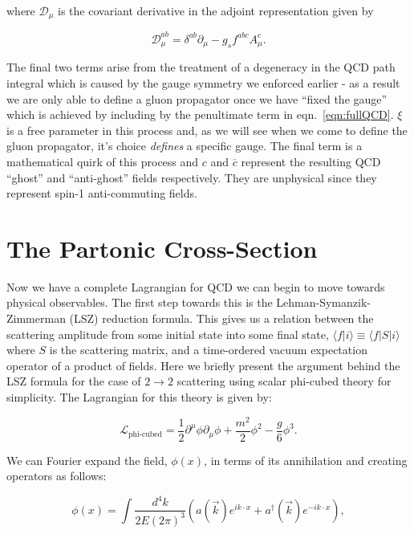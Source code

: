 	where $\mathcal{D}_{\mu}$ is the covariant derivative in the adjoint representation given by

	\begin{equation}
		\mathcal{D}_\mu^{ab} = \delta^{ab}\partial_\mu - g_sf^{abc}A^c_\mu.
	\end{equation}

	The final two terms arise from the treatment of a degeneracy in the QCD path integral which is caused by the gauge symmetry we
	enforced earlier - as a result we are only able to define a gluon propagator once we have ``fixed the gauge'' which is achieved by including
	by the penultimate term in eqn.~\eqref{eqn:fullQCD}.  $\xi$ is a free parameter in this process and, as we will see when we come
	to define the gluon propagator, it's choice \emph{defines} a specific gauge.  The final term is a mathematical
	quirk of this process and $c$ and $\overline{c}$ represent the resulting QCD ``ghost'' and ``anti-ghost'' fields respectively.
	They are unphysical since they represent spin-1 anti-commuting fields.

\section{The Partonic Cross-Section}
	\label{sec:partonicCrossSection}

	Now we have a complete Lagrangian for QCD we can begin to move towards physical observables.  The first step towards this
	is the Lehman-Symanzik-Zimmerman (LSZ) reduction formula.  This gives us a relation between the scattering amplitude
	from some initial state into some final state, $\langle f|i\rangle\equiv\langle f|S|i\rangle$ where $S$ is the
	scattering matrix, and a time-ordered vacuum expectation operator of a product of fields.  Here we briefly present
	the argument behind the LSZ formula for the case of $2\rightarrow2$ scattering using scalar phi-cubed theory for simplicity.
	The Lagrangian for this theory is given by:

	\begin{equation}
		\mathcal{L}_{\text{phi-cubed}} = \frac{1}{2}\partial^{\mu}\phi\partial_{\mu}\phi + \frac{m^2}{2}\phi^2 - \frac{g}{6}\phi^3.
		\label{eqn:phi3}
	\end{equation}

	We can Fourier expand the field, $\phi(x)$, in terms of its annihilation and creating operators as follows:

	\begin{equation}
		\phi(x) = \int\frac{d^4k}{2E(2\pi)^3}\left(a(\vec{k})e^{ik\cdot x} + a^\dagger(\vec{k})e^{-ik\cdot x}\right),
	\end{equation}

